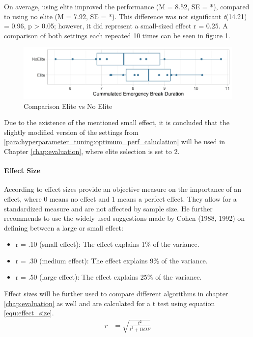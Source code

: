On average, using elite improved the performance (M = 8.52, SE = *), compared to using no elite (M = 7.92, SE = *). This difference was not significant \textit{t}(14.21) = 0.96, p > 0.05; however, it did represent a small-sized effect r = 0.25. A comparison of both settings each repeated 10 times can be seen in figure \ref{figure:elite_comparison}.

\begin{figure}[ht] 
	\label{figure:elite_comparison}
	\includegraphics[width=1\linewidth]{simulations/evaluation/plots/elite_vs_no_elite}
	\caption{Comparison Elite vs No Elite}
\end{figure}

Due to the existence of the mentioned small effect, it is concluded that the slightly modified version of the settings from \ref{para:hyperparameter_tuning:optimum_perf_caluclation} will be used in Chapter \ref{chap:evaluation}, where elite selection is set to 2.

\paragraph{Effect Size}
According to \cite{field_discovering_2012} effect sizes provide an objective measure on the importance of an effect, where 0 means no effect and 1 means a perfect effect. They allow for a standardized measure and are not affected by sample size. He further recommends to use the widely used suggestions made by Cohen (1988, 1992)  on defining between a large or small effect:
\begin{itemize}
	\item r = .10 (small effect): The effect explains 1\% of the variance. 
	\item r = .30 (medium effect): The effect explains 9\% of the variance. 
	\item r = .50 (large effect): The effect explains 25\% of the variance.
\end{itemize} 

Effect sizes will be further used to compare different algorithms in chapter \ref{chap:evaluation} as well and are calculated for a t test using equation \ref{equ:effect_size}.
\begin{equation} \label{equ:effect_size}
	\begin{split}
		r & = \sqrt{\frac{t^2}{t^2 + DOF}}
	\end{split}
\end{equation}




